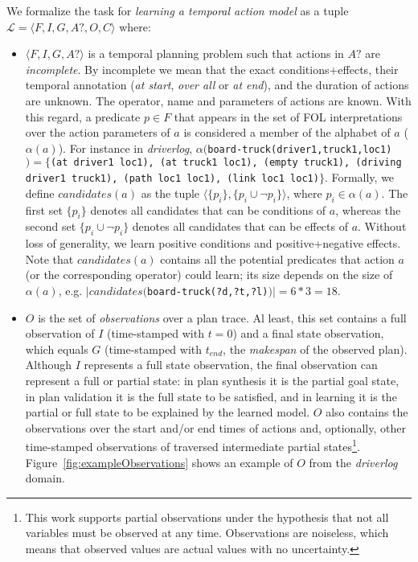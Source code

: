 \documentclass{ecai}
\newcommand{\tup}[1]{{\langle #1 \rangle}}
\begin{document}
We formalize the task for {\em learning a temporal action model} as a tuple $\mathcal{L}=\tup{F,I,G,A?,O,C}$ where:

\begin{itemize}
	
\item $\tup{F,I,G,A?}$ is a temporal planning problem such that actions in $A?$ are {\em incomplete}. By incomplete we mean that the exact conditions+effects, their temporal annotation (\textit{at start}, \textit{over all} or \textit{at end}), and the duration of actions are unknown.
The operator, name and parameters of actions are known.  
With this regard, a predicate $p\in F$ that appears in the set of FOL interpretations over the action parameters of $a$ is considered a member of the alphabet of $a$ ($\alpha(a)$). For instance in {\em driverlog},
$\alpha(${\footnotesize \texttt{board-truck(driver1,truck1,loc1)}$)=\{$\texttt{(at driver1 loc1), (at truck1 loc1), (empty truck1), (driving driver1 truck1), (path loc1 loc1), (link loc1 loc1)}}$\}$.
Formally, we define $candidates(a)$ as the tuple $\langle\{p_i\}, \{p_i \cup \neg p_i\} \rangle$, where $p_i \in \alpha(a)$. The first set $\{p_i\}$ denotes all candidates that can be conditions of $a$, whereas the second set $\{p_i \cup \neg p_i\}$ denotes all candidates that can be effects of $a$. Without loss of generality, we learn positive conditions and positive+negative effects. 
Note that $candidates(a)$ contains all the potential predicates that action $a$ (or the corresponding operator) could learn; its size depends on the size of $\alpha(a)$,
e.g. $|candidates($\texttt{board-truck(?d,?t,?l)}$)|=6*3=18$.


\item $O$ is the set of {\em observations} over a plan trace. Al least, this set contains a full observation of $I$ (time-stamped with $t=0$) and a final state observation, which equals $G$ (time-stamped with $t_{end}$, the {\em makespan} of the observed plan). Although $I$ represents a full state observation, the final observation can represent a full or partial state: in plan synthesis it is the partial goal state, in plan validation it is the full state to be satisfied, and in learning it is the partial or full state to be explained by the learned model.
$O$ also contains the observations over the start and/or end times of actions and, optionally, other 
time-stamped observations of traversed intermediate partial states\footnote{This work supports partial observations under the hypothesis that not all variables must be observed at any time. Observations are noiseless, which means that observed values are actual values with no uncertainty.}. Figure~\ref{fig:exampleObservations} shows an example of $O$ from the {\em driverlog} domain.



\end{itemize}
\end{document}
